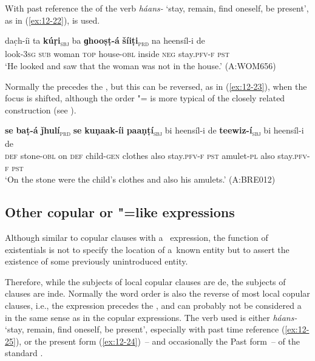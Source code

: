 With past  reference the  of the verb \textit{háans-} `stay, remain, find oneself, be present', as in (\ref{ex:12-22}), is used.

\begin{exe}
\ex
\label{ex:12-22}
\gll dac̣h-íi ta {\ob}\textbf{kúṛi}{\cb}\textsubscript{\textsc{\upshape sbj}} ba {\ob}\textbf{ɡhooṣṭ-á} \textbf{šíiṭi}{\cb}\textsubscript{\textsc{\upshape prd}} na heensíl-i de \\
look-3\textsc{sg} \textsc{sub} woman \textsc{top} house-\textsc{obl} inside \textsc{neg} stay.\textsc{pfv-f} \textsc{pst} \\
\glt `He looked and saw that the woman was not in the house.' (A:WOM656)
\end{exe}

Normally the  precedes the   , but this can be reversed, as in (\ref{ex:12-23}), when the focus is shifted, although the order "= is more typical of the closely related  construction (see ).

\begin{exe}
\ex
\label{ex:12-23}
\gll {\ob}\textbf{se} \textbf{baṭ-á} \textbf{ǰhulí}{\cb}\textsubscript{\textsc{\upshape prd}} {\ob}\textbf{se} \textbf{kuṇaak-íi} \textbf{paaṇṭí}{\cb}\textsubscript{\textsc{\upshape sbj}} bi heensíl-i de {\ob}\textbf{teewiz-í}{\cb}\textsubscript{\textsc{\upshape sbj}} bi heensíl-i de\\
\textsc{def} stone-\textsc{obl} on \textsc{def} child-\textsc{gen} clothes  also stay.\textsc{pfv-f}
\textsc{pst} amulet-\textsc{pl} also stay.\textsc{pfv-f} \textsc{pst}\\
\glt `On the stone were the child's clothes and also his amulets.' (A:BRE012)
\end{exe}

\subsection{Other copular or "=like expressions}
\label{subsec:12-1-4}

 Although similar to copular clauses with a~ expression, the function of existentials is not to specify the location of a~known entity but to assert the existence of some previously unintroduced entity. 


Therefore, while the subjects of local copular clauses are de, the subjects of  clauses are inde. Normally the word order is also the reverse of most local copular clauses, i.e., the  expression precedes the   , and can probably not be considered a~ in the same sense as in the copular  expressions. The verb used is either \textit{háans-} `stay, remain, find oneself, be present', especially with past time reference (\ref{ex:12-25}), or the present form (\ref{ex:12-24})~-- and occasionally the Past form~-- of the standard .

